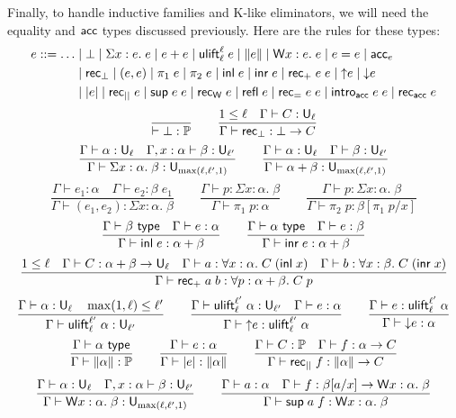 Finally, to handle inductive families and K-like eliminators, we will need the equality and $\mathsf{acc}$ types discussed previously. Here are the rules for these types:
\begin{align*}
e::=\dots&\mid\bot\mid\Sigma x:e.\;e\mid e+e\mid \ulift_{\ell}^{\ell}\;e\mid \|e\|\mid \mathsf{W} x:e.\;e\mid e=e\mid \acc_e\\
&\mid\rec_\bot\mid(e,e)\mid\pi_1\;e\mid\pi_2\;e\mid \inl e\mid \inr e\mid \rec_+\;e\;e\mid {\uparrow}e\mid {\downarrow}e\\
&\mid |e|\mid\rec_{||}\;e\mid\sup e\;e\mid\rec_\W\;e\mid \refl\;e\mid \rec_=\;e\;e\mid \intro_\acc\;e\;e\mid\rec_\acc\;e
\end{align*}
$$\frac{}{\vdash \bot:\P}\qquad
\frac{1\le\ell\quad \Gamma\vdash C:\U_\ell}{\Gamma\vdash \rec_\bot:\bot\to C}$$
$$\frac{\Gamma\vdash \alpha:\U_\ell\quad \Gamma,x:\alpha\vdash \beta:\U_{\ell'}}
{\Gamma\vdash \Sigma x:\alpha.\;\beta:\U_{\max(\ell,\ell',1)}}\qquad
\frac{\Gamma\vdash \alpha:\U_\ell\quad \Gamma\vdash \beta:\U_{\ell'}}
{\Gamma\vdash \alpha+\beta:\U_{\max(\ell,\ell',1)}}$$
$$\frac{\Gamma\vdash e_1:\alpha\quad \Gamma\vdash e_2:\beta\;e_1}
{\Gamma\vdash(e_1,e_2):\Sigma x:\alpha.\;\beta}\qquad
\frac{\Gamma\vdash p:\Sigma x:\alpha.\;\beta}{\Gamma\vdash \pi_1\;p:\alpha}\qquad
\frac{\Gamma\vdash p:\Sigma x:\alpha.\;\beta}
{\Gamma\vdash \pi_2\;p:\beta[\pi_1\;p/x]}$$
$$\frac{\Gamma\vdash \beta\type\quad \Gamma\vdash e:\alpha}{\Gamma\vdash \inl e:\alpha+\beta}\qquad
\frac{\Gamma\vdash \alpha\type\quad \Gamma\vdash e:\beta}{\Gamma\vdash \inr e:\alpha+\beta}$$
$$\frac{1\le\ell\quad \Gamma\vdash C:\alpha+\beta\to\U_\ell\quad \Gamma\vdash a:\forall x:\alpha.\;C\;(\inl x)\quad \Gamma\vdash b:\forall x:\beta.\;C\;(\inr x)}{\Gamma\vdash \rec_+\;a\;b:\forall p:\alpha+\beta.\;C\;p}$$
$$\frac{\Gamma\vdash \alpha:\U_\ell\quad \max(1,\ell)\le\ell'}
{\Gamma\vdash\ulift_{\ell}^{\ell'}\;\alpha:\U_{\ell'}}\qquad
\frac{\Gamma\vdash\ulift_{\ell}^{\ell'}\;\alpha:\U_{\ell'}\quad \Gamma\vdash e:\alpha}{\Gamma\vdash {\uparrow}e:\ulift_{\ell}^{\ell'}\;\alpha}\qquad
\frac{\Gamma\vdash e:\ulift_{\ell}^{\ell'}\;\alpha}{\Gamma\vdash {\downarrow}e:\alpha}$$
$$\frac{\Gamma\vdash \alpha\type}
{\Gamma\vdash\|\alpha\|:\P}\qquad
\frac{\Gamma\vdash e:\alpha}{\Gamma\vdash |e|:\|\alpha\|}\qquad
\frac{\Gamma\vdash C:\P\quad \Gamma\vdash f:\alpha\to C}{\Gamma\vdash \rec_{||}\;f:\|\alpha\|\to C}$$
$$\frac{\Gamma\vdash \alpha:\U_\ell\quad \Gamma,x:\alpha\vdash\beta:\U_{\ell'}}
{\Gamma\vdash\W x:\alpha.\;\beta:\U_{\max(\ell,\ell',1)}}\qquad
\frac{\Gamma\vdash a:\alpha\quad\Gamma\vdash f:\beta[a/x]\to \W x:\alpha.\;\beta}{\Gamma\vdash\sup a\;f:\W x:\alpha.\;\beta}$$
